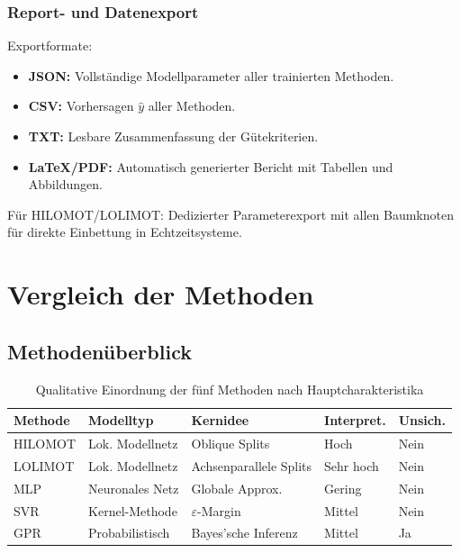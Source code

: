 \documentclass[11pt,a4paper]{report}
\begin{document}
\subsection{Report- und Datenexport}

Exportformate:
\begin{itemize}
\item \textbf{JSON:} Vollst\"{a}ndige Modellparameter aller trainierten Methoden.
\item \textbf{CSV:} Vorhersagen $\hat{y}$ aller Methoden.
\item \textbf{TXT:} Lesbare Zusammenfassung der G\"{u}tekriterien.
\item \textbf{LaTeX/PDF:} Automatisch generierter Bericht mit Tabellen und Abbildungen.
\end{itemize}

F\"{u}r HILOMOT/LOLIMOT: Dedizierter Parameterexport mit allen Baumknoten f\"{u}r direkte
Einbettung in Echtzeitsysteme.

\chapter{Vergleich der Methoden}

\section{Methoden\"{u}berblick}

\begin{table}[H]
\centering
\caption{Qualitative Einordnung der f\"{u}nf Methoden nach Hauptcharakteristika}
\label{tab:methoden_uebersicht}
\begin{tabular}{p{2.5cm}p{2.8cm}p{3.5cm}p{2.5cm}p{1.8cm}}
\toprule
\textbf{Methode} & \textbf{Modelltyp} & \textbf{Kernidee} & \textbf{Interpret.} & \textbf{Unsich.} \\
\midrule
HILOMOT & Lok. Modellnetz & Oblique Splits & Hoch & Nein \\
LOLIMOT & Lok. Modellnetz & Achsenparallele Splits & Sehr hoch & Nein \\
MLP & Neuronales Netz & Globale Approx. & Gering & Nein \\
SVR & Kernel-Methode & $\varepsilon$-Margin & Mittel & Nein \\
GPR & Probabilistisch & Bayes'sche Inferenz & Mittel & Ja \\
\bottomrule
\end{tabular}
\end{table}
\end{document}
